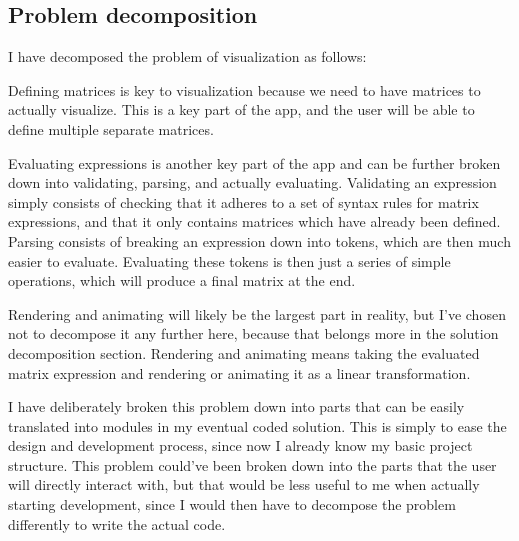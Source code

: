 \documentclass[../main.tex]{subfiles}
\begin{document}
\subsection{Problem decomposition\label{subsection:problem-decomposition}}

I have decomposed the problem of visualization as follows:
\begin{center}
\end{center}
Defining matrices is key to visualization because we need to have matrices to actually visualize. This is a key part of the app, and the user will be able to define multiple separate matrices.

Evaluating expressions is another key part of the app and can be further broken down into validating, parsing, and actually evaluating. Validating an expression simply consists of checking that it adheres to a set of syntax rules for matrix expressions, and that it only contains matrices which have already been defined. Parsing consists of breaking an expression down into tokens, which are then much easier to evaluate. Evaluating these tokens is then just a series of simple operations, which will produce a final matrix at the end.

Rendering and animating will likely be the largest part in reality, but I've chosen not to decompose it any further here, because that belongs more in the solution decomposition section. Rendering and animating means taking the evaluated matrix expression and rendering or animating it as a linear transformation.

I have deliberately broken this problem down into parts that can be easily translated into modules in my eventual coded solution. This is simply to ease the design and development process, since now I already know my basic project structure. This problem could've been broken down into the parts that the user will directly interact with, but that would be less useful to me when actually starting development, since I would then have to decompose the problem differently to write the actual code.
\end{document}

